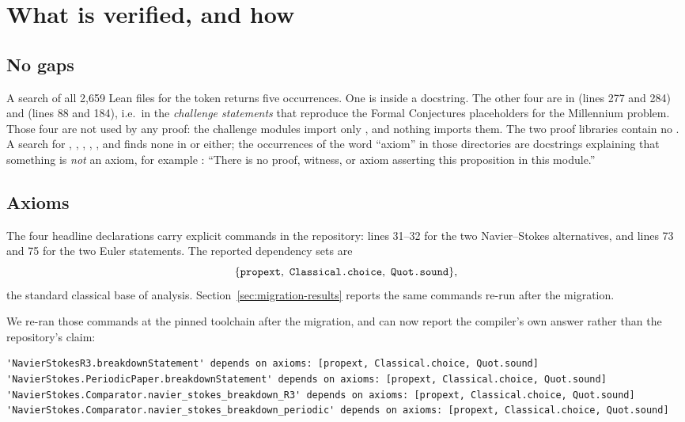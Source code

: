 \section{What is verified, and how}
\label{sec:verification}

\subsection{No gaps}
\label{sec:nogaps}

A search of all 2,659 Lean files for the token  returns five occurrences.
One is inside a docstring. The other four are in
 (lines 277 and 284) and
 (lines 88 and 184), i.e.\ in the \emph{challenge
statements} that reproduce the Formal Conjectures placeholders for the Millennium problem.
Those four are not used by any proof: the challenge modules import only \Mathlib, and
nothing imports them. The two proof libraries contain no . A search for
, , , ,
,  and  finds none in  or
 either; the occurrences of the word ``axiom'' in those directories are
docstrings explaining that something is \emph{not} an axiom, for example
: ``There is no proof, witness, or axiom
asserting this proposition in this module.''

\subsection{Axioms}
\label{sec:axioms}

The four headline declarations carry explicit  commands in the
repository:  lines 31--32 for the two
Navier--Stokes alternatives, and  lines 73 and 75 for the two
Euler statements. The reported dependency sets are
\[
  \{\lean{propext},\ \lean{Classical.choice},\ \lean{Quot.sound}\},
\]
the standard classical base of \Mathlib{} analysis. Section~\ref{sec:migration-results}
reports the same commands re-run after the migration.

We re-ran those commands at the pinned toolchain after the migration, and can now report
the compiler's own answer rather than the repository's claim:

\begin{lstlisting}[language=ML]
'NavierStokesR3.breakdownStatement' depends on axioms: [propext, Classical.choice, Quot.sound]
'NavierStokes.PeriodicPaper.breakdownStatement' depends on axioms: [propext, Classical.choice, Quot.sound]
'NavierStokes.Comparator.navier_stokes_breakdown_R3' depends on axioms: [propext, Classical.choice, Quot.sound]
'NavierStokes.Comparator.navier_stokes_breakdown_periodic' depends on axioms: [propext, Classical.choice, Quot.sound]
\end{lstlisting}

